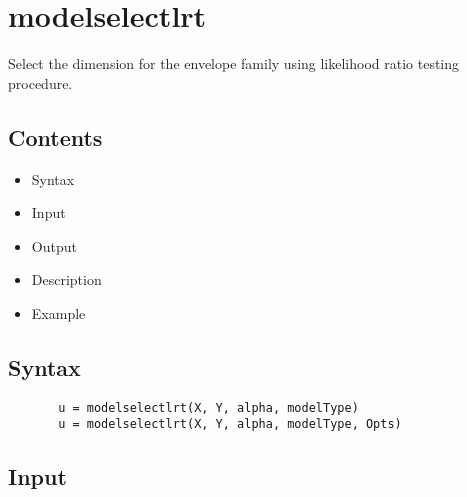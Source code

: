 \documentclass[a4paper,11pt,openany]{memoir}
\begin{document}
    
\rmfamily
\color{black}\section{modelselectlrt}

\begin{par}
Select the dimension for the envelope family using likelihood ratio testing procedure.
\end{par} \vspace{1em}

\subsection*{Contents}

\begin{itemize}
\setlength{\itemsep}{-1ex}
   \item Syntax
   \item Input
   \item Output
   \item Description
   \item Example
\end{itemize}


\subsection*{Syntax}


\begin{verbatim}       u = modelselectlrt(X, Y, alpha, modelType)
       u = modelselectlrt(X, Y, alpha, modelType, Opts)\end{verbatim}
    

\subsection*{Input}
\end{document}
